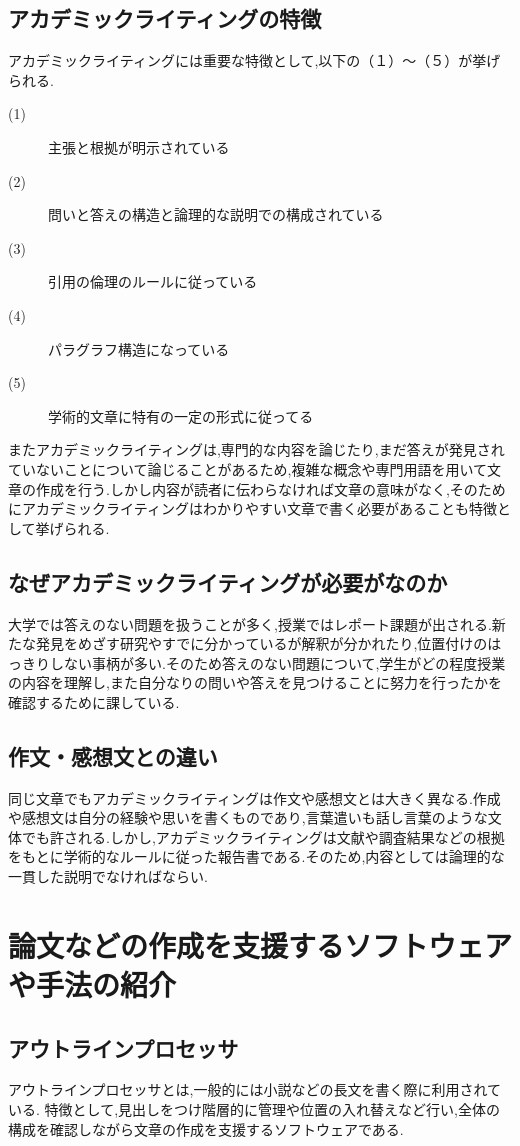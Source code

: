 \documentclass[a4j,12pt]{jarticle}
\begin{document}
\subsection{アカデミックライティングの特徴}
アカデミックライティングには重要な特徴として,以下の（１）〜（５）が挙げられる.
\begin{description}
  \item[(1)] 主張と根拠が明示されている
  \item[(2)] 問いと答えの構造と論理的な説明での構成されている
  \item[(3)] 引用の倫理のルールに従っている
  \item[(4)] パラグラフ構造になっている
  \item[(5)] 学術的文章に特有の一定の形式に従ってる
 \end{description}
 またアカデミックライティングは,専門的な内容を論じたり,まだ答えが発見されていないことについて論じることがあるため,複雑な概念や専門用語を用いて文章の作成を行う.しかし内容が読者に伝わらなければ文章の意味がなく,そのためにアカデミックライティングはわかりやすい文章で書く必要があることも特徴として挙げられる\cite{ren7}.
 
\subsection{なぜアカデミックライティングが必要がなのか}
大学では答えのない問題を扱うことが多く,授業ではレポート課題が出される.新たな発見をめざす研究やすでに分かっているが解釈が分かれたり,位置付けのはっきりしない事柄が多い.そのため答えのない問題について,学生がどの程度授業の内容を理解し,また自分なりの問いや答えを見つけることに努力を行ったかを確認するために課している.

\subsection{作文・感想文との違い}
同じ文章でもアカデミックライティングは作文や感想文とは大きく異なる.作成や感想文は自分の経験や思いを書くものであり,言葉遣いも話し言葉のような文体でも許される.しかし,アカデミックライティングは文献や調査結果などの根拠をもとに学術的なルールに従った報告書である.そのため,内容としては論理的な一貫した説明でなければならい.

\newpage
\section{論文などの作成を支援するソフトウェアや手法の紹介}
\subsection{アウトラインプロセッサ}
アウトラインプロセッサとは,一般的には小説などの長文を書く際に利用されている.
特徴として,見出しをつけ階層的に管理や位置の入れ替えなど行い,全体の構成を確認しながら文章の作成を支援するソフトウェアである.
\end{document}
